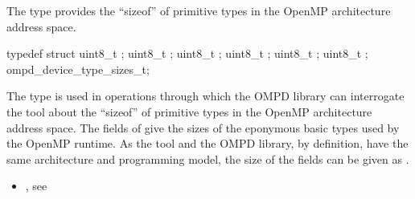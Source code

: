 \summary
The  type provides the ``sizeof'' of 
primitive types in the OpenMP architecture address space.

\format

\begin{ccppspecific}
\begin{ompSyntax}
typedef struct {
  uint8_t ;
  uint8_t ;
  uint8_t ;
  uint8_t ;
  uint8_t ;
  uint8_t ;
} ompd_device_type_sizes_t;
\end{ompSyntax}
\end{ccppspecific}


\descr
The  type is used in operations through which 
the OMPD library can interrogate the tool about the ``sizeof'' of primitive 
types in the OpenMP architecture address space. The fields of 
 give the sizes of the eponymous basic types 
used by the OpenMP runtime. As the tool and the OMPD library, by definition, 
have the same architecture and programming model, the size of the fields can 
be given as .

\crossreferences
\begin{itemize}
\item {}, 
see 
\end{itemize}
